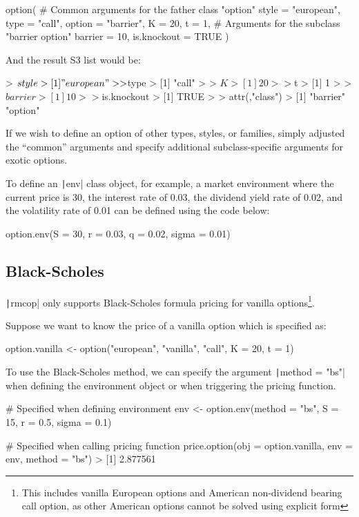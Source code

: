 \begin{Rminted}
option(
    # Common arguments for the father class "option"
    style = "european", type = "call", option = "barrier", K = 20, t = 1,
    # Arguments for the subclass "barrier option"
    barrier = 10, is.knockout = TRUE
)
\end{Rminted}

And the result S3 list would be:

\begin{Rminted}
> $style
> [1] "european"
> 
> $type
> [1] "call"
> 
> $K
> [1] 20
> 
> $t
> [1] 1
> 
> $barrier
> [1] 10
> 
> $is.knockout
> [1] TRUE
> 
> attr(,"class")
> [1] "barrier" "option" 
\end{Rminted}

If we wish to define an option of other types, styles, or families, simply adjusted the ``common'' arguments and specify additional subclass-specific arguments for exotic options.

To define an \texttt|env| class object, for example, a market environment where the current price is 30, the interest rate of 0.03, the dividend yield rate of 0.02, and the volatility rate of 0.01 can be defined using the code below:

\begin{Rminted}
option.env(S = 30, r = 0.03, q = 0.02, sigma = 0.01)
\end{Rminted}

\subsection{Black-Scholes}

\texttt|rmcop| only supports Black-Scholes formula pricing for vanilla options\footnote{This includes vanilla European options and American non-dividend bearing call option, as other American options cannot be solved using explicit form}.

Suppose we want to know the price of a vanilla option which is specified as:

\begin{Rminted}
option.vanilla <- option("european", "vanilla", "call", K = 20, t = 1)
\end{Rminted}

To use the Black-Scholes method, we can specify the argument \texttt|method = "bs"| when defining the environment object or when triggering the pricing function.

\begin{Rminted}
# Specified when defining environment
env <- option.env(method = "bs", S = 15, r = 0.5, sigma = 0.1)

# Specified when calling pricing function
price.option(obj = option.vanilla, env = env, method = "bs")
> [1] 2.877561
\end{Rminted}

